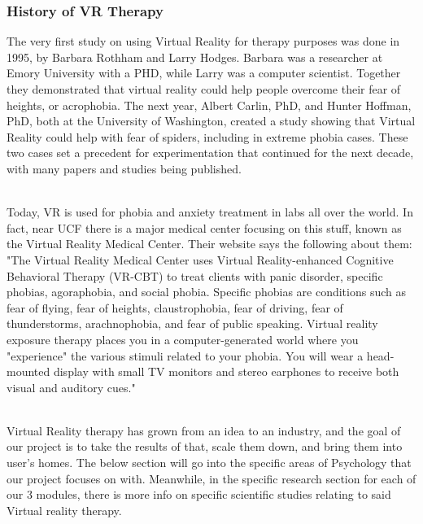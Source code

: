 \documentclass[a4paper,10pt]{article}
\begin{document}
\subsubsection{History of VR Therapy}
The very first study on using Virtual Reality for therapy purposes was done in 1995, by Barbara Rothham and Larry Hodges.  Barbara was a researcher at Emory University with a PHD, while 
Larry was a computer scientist.  Together they demonstrated that virtual reality could help people overcome their fear of heights, or acrophobia.  \cite{alCarl}
The next year, Albert Carlin, PhD, and Hunter Hoffman, PhD, both at the University of Washington, created a study showing that Virtual Reality could help with fear of spiders, including 
in extreme phobia cases.  These two cases set a precedent for experimentation that continued for the next decade, with many papers and studies being published.
\par~\\
Today, VR is used for phobia and anxiety treatment in labs all over the world.  In fact, near UCF there is a major medical center focusing on this stuff, known as the Virtual Reality
Medical Center.  Their website says the following about them: "The Virtual Reality Medical Center uses Virtual Reality-enhanced Cognitive Behavioral Therapy (VR-CBT) to treat clients 
with panic disorder, specific phobias, agoraphobia, and social phobia. Specific phobias are conditions such as fear of flying, fear of heights, claustrophobia, fear of driving, fear of
thunderstorms, arachnophobia, and fear of public speaking. Virtual reality exposure therapy places you in a computer-generated world where you "experience" the various stimuli related 
to your phobia. You will wear a head- mounted display with small TV monitors and stereo earphones to receive both visual and auditory cues."\cite{vrPhobia}
\par~\\
Virtual Reality therapy has grown from an idea to an industry, and the goal of our project is to take the results of that, scale them down, and bring them into user's homes.  
The below section will go into the specific areas of Psychology that our project focuses on with.  Meanwhile, in the specific research section for each of our 3 modules, 
there is more info on specific scientific studies relating to said Virtual reality therapy.
\par~\\
\pagebreak
\end{document}
